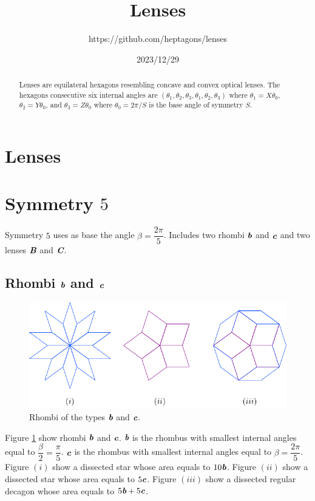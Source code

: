 \documentclass[11pt]{article}
\title{Lenses}
\author{https://github.com/heptagons/lenses}
\date{2023/12/29}
\def\mathbi#1{\textbf{\em #1}}
\begin{document}
\maketitle
\begin{abstract}
Lenses are equilateral hexagons resembling concave and convex optical lenses. The hexagons consecutive six internal angles are $(\theta_1,\theta_2,\theta_3,\theta_1,\theta_2,\theta_3)$ where $\theta_1=X\theta_0$, $\theta_2=Y\theta_0$, and $\theta_3=Z\theta_0$ where $\theta_0 = 2\pi/S$ is the base angle of symmetry $S$.
\end{abstract}

\section{Lenses}

\section{Symmetry $5$}

Symmetry $5$ uses as base the angle $\beta = \dfrac{2\pi}5$. Includes two rhombi $\mathbi{b}$ and $\mathbi{c}$ and two lenses $\mathbi{B}$ and $\mathbi{C}$.


\subsection{Rhombi $\mathbi{b}$ and $\mathbi{c}$}

\begin{figure}[H]
\centering
\includegraphics[scale=1.1]{bc/rhombi}
\caption{Rhombi of the types $\mathbi{b}$ and $\mathbi{c}$.}
\label{fig:bc-rhombi}
\end{figure}

Figure \ref{fig:bc-rhombi} show rhombi $\mathbi{b}$ and $\mathbi{c}$. $\mathbi{b}$ is the rhombus with smallest internal angles equal to $\dfrac{\beta}2 = \dfrac{\pi}5$. $\mathbi{c}$ is the rhombus with smallest internal angles equal to $\beta = \dfrac{2\pi}5$.
Figure $(i)$ show a dissected star whose area equals to $10\mathbi{b}$.
Figure $(ii)$ show a dissected star whose area equals to $5\mathbi{c}$.
Figure $(iii)$ show a dissected regular decagon whose area equals to $5\mathbi{b} + 5\mathbi{c}$.
\end{document}
